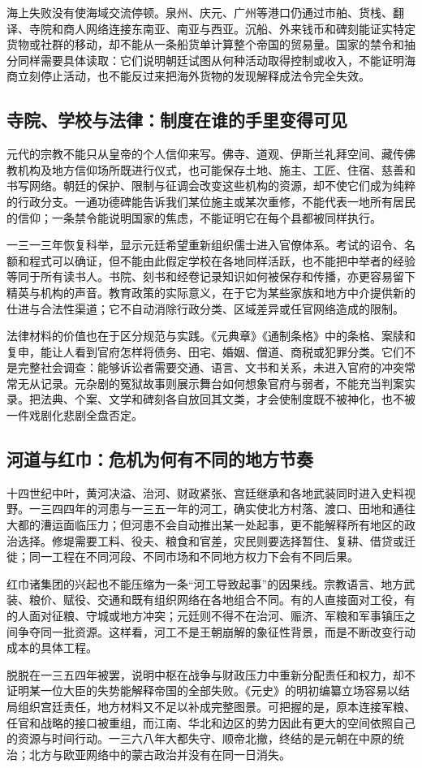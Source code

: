 海上失败没有使海域交流停顿。泉州、庆元、广州等港口仍通过市舶、货栈、翻译、寺院和商人网络连接东南亚、南亚与西亚。沉船、外来钱币和碑刻能证实特定货物或社群的移动，却不能从一条船货单计算整个帝国的贸易量。国家的禁令和抽分同样需要具体读取：它们说明朝廷试图从何种活动取得控制或收入，不能证明海商立刻停止活动，也不能反过来把海外货物的发现解释成法令完全失效。

\subsection{寺院、学校与法律：制度在谁的手里变得可见}

元代的宗教不能只从皇帝的个人信仰来写。佛寺、道观、伊斯兰礼拜空间、藏传佛教机构及地方信仰场所既进行仪式，也可能保存土地、施主、工匠、住宿、慈善和书写网络。朝廷的保护、限制与征调会改变这些机构的资源，却不使它们成为纯粹的行政分支。一通功德碑能告诉我们某位施主或某次重修，不能代表一地所有居民的信仰；一条禁令能说明国家的焦虑，不能证明它在每个县都被同样执行。

一三一三年恢复科举，显示元廷希望重新组织儒士进入官僚体系。考试的诏令、名额和程式可以确证，但不能由此假定学校在各地同样活跃，也不能把中举者的经验等同于所有读书人。书院、刻书和经卷记录知识如何被保存和传播，亦更容易留下精英与机构的声音。教育政策的实际意义，在于它为某些家族和地方中介提供新的仕进与合法性渠道；它不自动消除行政分类、区域差异或任官网络造成的限制。

法律材料的价值也在于区分规范与实践。《元典章》《通制条格》中的条格、案牍和复申，能让人看到官府怎样将债务、田宅、婚姻、僧道、商税或犯罪分类。它们不是完整社会调查：能够诉讼者需要交通、语言、文书和关系，未进入官府的冲突常常无从记录。元杂剧的冤狱故事则展示舞台如何想象官府与弱者，不能充当判案实录。把法典、个案、文学和碑刻各自放回其文类，才会使制度既不被神化，也不被一件戏剧化悲剧全盘否定。

\subsection{河道与红巾：危机为何有不同的地方节奏}

十四世纪中叶，黄河决溢、治河、财政紧张、宫廷继承和各地武装同时进入史料视野。一三四四年的河患与一三五一年的河工，确实使北方村落、渡口、田地和通往大都的漕运面临压力；但河患不会自动推出某一处起事，更不能解释所有地区的政治选择。修堤需要工料、役夫、粮食和官差，灾民则要选择暂住、复耕、借贷或迁徙；同一工程在不同河段、不同市场和不同地方权力下会有不同后果。

红巾诸集团的兴起也不能压缩为一条“河工导致起事”的因果线。宗教语言、地方武装、粮价、赋役、交通和既有组织网络在各地组合不同。有的人直接面对工役，有的人面对征粮、守城或地方冲突；元廷则不得不在治河、赈济、军粮和军事镇压之间争夺同一批资源。这样看，河工不是王朝崩解的象征性背景，而是不断改变行动成本的具体工程。

脱脱在一三五四年被罢，说明中枢在战争与财政压力中重新分配责任和权力，却不证明某一位大臣的失势能解释帝国的全部失败。《元史》的明初编纂立场容易以结局组织宫廷责任，地方材料又不足以补成完整图景。可把握的是，原本连接军粮、任官和战略的接口被重组，而江南、华北和边区的势力因此有更大的空间依照自己的资源与时间行动。一三六八年大都失守、顺帝北撤，终结的是元朝在中原的统治；北方与欧亚网络中的蒙古政治并没有在同一日消失。
